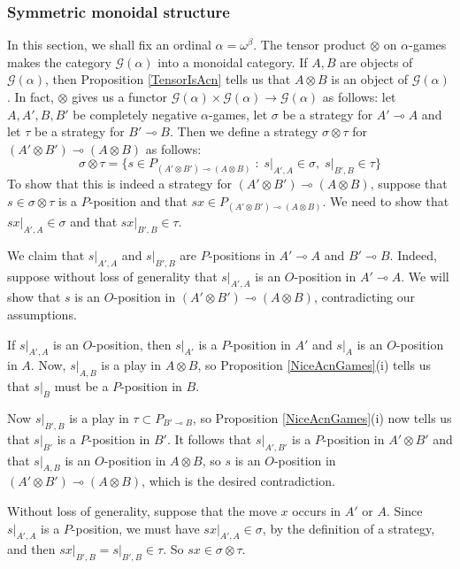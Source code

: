 \documentclass[11pt]{article} %
\theoremstyle{plain} %
\theoremstyle{definition} %
\theoremstyle{note}
\theoremstyle{exercisestyle}
\newcommand{\tensor}{\otimes}
\renewcommand{\implies}{\multimap}
\newcommand{\G}{\mathcal G}
\newcommand{\suchthat}{\;\colon\;}
\begin{document}
\subsubsection{Symmetric monoidal structure}

In this section, we shall fix an ordinal $\alpha=\omega^\beta$.  The tensor product $\tensor$ on $\alpha$-games makes the category $\G(\alpha)$ into a monoidal category.  If $A,B$ are objects of $\G(\alpha)$, then Proposition \ref{TensorIsAcn} tells us that $A\tensor B$ is an object of $\G(\alpha)$.  In fact, $\tensor$ gives us a functor $\G(\alpha)\times\G(\alpha)\to\G(\alpha)$ as follows: let $A,A',B,B'$ be completely negative $\alpha$-games, let $\sigma$ be a strategy for $A'\implies A$ and let $\tau$ be a strategy for $B'\implies B$.  Then we define a strategy $\sigma\tensor\tau$ for $(A'\tensor B')\implies (A\tensor B)$ as follows:
\[
  \sigma\tensor\tau = \{s\in P_{(A'\tensor B')\implies(A\tensor B)}\suchthat s\vert_{A',A}\in\sigma,\;s\vert_{B',B}\in\tau\}
  \]
To show that this is indeed a strategy for $(A'\tensor B')\implies (A\tensor B)$, suppose that $s\in\sigma\tensor\tau$ is a $P$-position and that $sx\in P_{(A'\tensor B')\implies (A\tensor B)}$.  We need to show that $sx\vert_{A',A}\in\sigma$ and that $sx\vert_{B', B}\in\tau$.  

We claim that $s\vert_{A',A}$ and $s\vert_{B',B}$ are $P$-positions in $A'\implies A$ and $B'\implies B$.  Indeed, suppose without loss of generality that $s\vert_{A',A}$ is an $O$-position in $A'\implies A$.  We will show that $s$ is an $O$-position in $(A'\tensor B')\implies (A\tensor B)$, contradicting our assumptions.

If $s\vert_{A',A}$ is an $O$-position, then $s\vert_{A'}$ is a $P$-position in $A'$ and $s\vert_A$ is an $O$-position in $A$.  Now, $s\vert_{A,B}$ is a play in $A\tensor B$, so Proposition \ref{NiceAcnGames}(i) tells us that $s\vert_B$ must be a $P$-position in $B$.  

Now $s\vert_{B',B}$ is a play in $\tau\subset P_{B'\implies B}$, so Proposition \ref{NiceAcnGames}(i) now tells us that $s\vert_{B'}$ is a $P$-position in $B'$.  It follows that $s\vert_{A',B'}$ is a $P$-position in $A'\tensor B'$ and that $s\vert_{A,B}$ is an $O$-position in $A\tensor B$, so $s$ is an $O$-position in $(A'\tensor B')\implies (A\tensor B)$, which is the desired contradiction.

Without loss of generality, suppose that the move $x$ occurs in $A'$ or $A$.  Since $s\vert_{A', A}$ is a $P$-position, we must have $sx\vert_{A',A}\in\sigma$, by the definition of a strategy, and then $s x\vert_{B',B}=s\vert_{B',B}\in\tau$.  So $sx\in\sigma\tensor\tau$.
\end{document}
